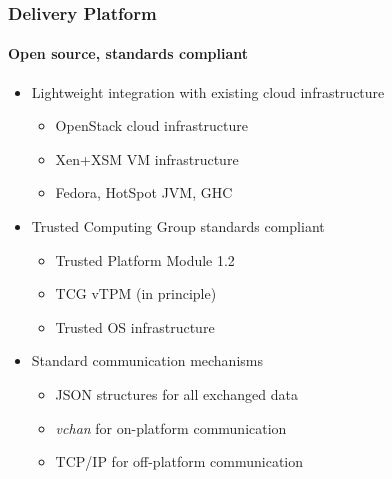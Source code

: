 \documentclass{beamer}
\begin{document}
\begin{frame}
  \frametitle{Delivery Platform}
  \framesubtitle{Open source, standards compliant}

  \begin{itemize}
  \item Lightweight integration with existing cloud infrastructure
    \begin{itemize}
    \item OpenStack cloud infrastructure
    \item Xen+XSM VM infrastructure
    \item Fedora, HotSpot JVM, GHC
    \end{itemize}
  \item Trusted Computing Group standards compliant
    \begin{itemize}
    \item Trusted Platform Module 1.2
    \item TCG vTPM (in principle)
    \item Trusted OS infrastructure
    \end{itemize}
  \item Standard communication mechanisms
    \begin{itemize}
    \item JSON structures for all exchanged data
    \item \textsl{vchan} for on-platform communication
    \item TCP/IP for off-platform communication
    \end{itemize}
  \end{itemize}
\end{frame}
\end{document}
